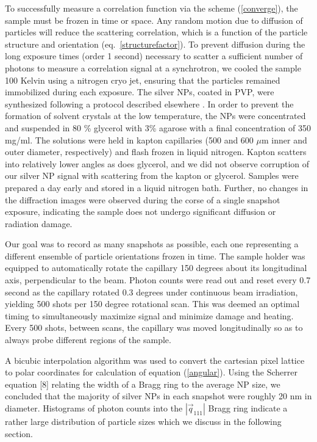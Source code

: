 \documentclass [11pt,fleqn]{article}
\begin{document}
To successfully measure a correlation function via the scheme (\ref{converge}), the sample must be frozen in time or space. Any random motion due to diffusion of particles will reduce the scattering correlation, which is a function of the particle structure and orientation (eq.~\ref{structurefactor}). To prevent diffusion during the long exposure times (order 1 second) necessary to scatter a sufficient number of photons to measure a correlation signal at a synchrotron, we cooled the sample 100 Kelvin using a nitrogen cryo jet, ensuring that the particles remained immobilized during each exposure. The silver NPs, coated in PVP, were synthesized following a protocol described elsewhere \cite{Levard:2011bx}. In order to prevent the formation of solvent crystals at the low temperature, the NPs were concentrated and suspended in 80 \% glycerol with 3\% agarose with a final concentration of 350 mg/ml. The solutions were held in kapton capillaries (500 and 600 $\mu$m inner and outer diameter, respectively) and flash frozen in liquid nitrogen. Kapton scatters into relatively lower angles as does glycerol, and we did not observe corruption of our silver NP signal with scattering from the kapton or glycerol. Samples were prepared a day early and stored in a liquid nitrogen bath. Further, no changes in the diffraction images were observed during the corse of a single snapshot exposure, indicating the sample does not undergo significant diffusion or radiation damage.

Our goal was to record as many snapshots as possible, each one representing a different ensemble of particle orientations frozen in time. The sample holder was equipped to automatically rotate the capillary 150 degrees about its longitudinal axis, perpendicular to the beam. Photon counts were read out and reset every 0.7 second as the capillary rotated 0.3 degrees under continuous beam irradiation, yielding 500 shots per 150 degree rotational scan. This was deemed an optimal timing to simultaneously maximize signal and minimize damage and heating. Every 500 shots, between scans, the capillary was moved longitudinally so as to always probe different regions of the sample.

A bicubic interpolation algorithm was used to convert the cartesian pixel lattice to polar coordinates for calculation of equation (\ref{angular}). Using the Scherrer equation [8] relating the width of a Bragg ring to the average NP size, we concluded that the majority of silver NPs in each snapshot were roughly 20 nm in diameter. Histograms of photon counts into the $|\vec{q}_{111}|$ Bragg ring indicate a rather large distribution of particle sizes which we discuss in the following section.
\end{document}
